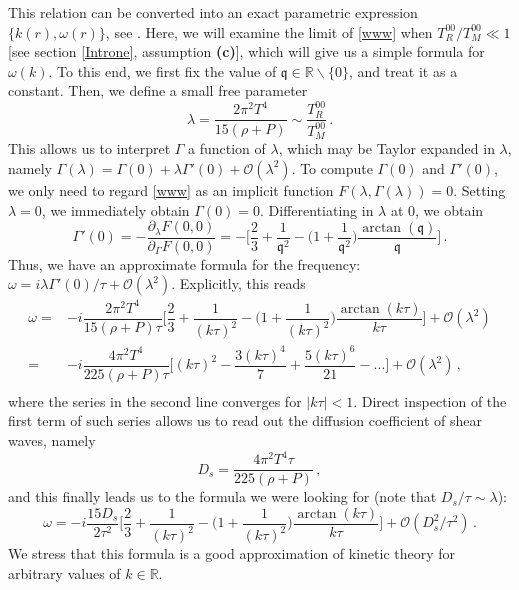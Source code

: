 \documentclass[a4paper, amsfonts, amssymb, amsmath, reprint, showkeys, nofootinbib, twoside,notitlepage,onecolumn]{revtex4-2}
\newcommand{\q}{{\mathfrak{q}}}
\theoremstyle{definition}
\theoremstyle{theorem}
\theoremstyle{corollary}
\begin{document}
This relation can be converted into an exact parametric expression $\{k(r),\omega(r)\}$, see \cite{GavassinoShearRadiation2024jej}. Here, we will examine the limit of \eqref{www} when $T_R^{00}/T_M^{00}\ll 1$ [see section \ref{Introne}, assumption \textbf{(c)}], which will give us a simple formula for $\omega(k)$. To this end, we first fix the value of $\q {\in} \mathbb{R}\backslash \{0\}$, and treat it as a constant. Then, we define a small free parameter
\begin{equation}\label{lambo}
    \lambda = \dfrac{2\pi^2 T^4}{15(\rho{+}P)} \sim \dfrac{T_R^{00}}{T_M^{00}} \, .
\end{equation}
This allows us to interpret $\Gamma$ a function of $\lambda$, which may be Taylor expanded in $\lambda$, namely $\Gamma(\lambda)=\Gamma(0)+\lambda  \Gamma'(0)+\mathcal{O}(\lambda^2)$. To compute $\Gamma(0)$ and $\Gamma'(0)$, we only need to regard \eqref{www} as an implicit function $F(\lambda,\Gamma(\lambda))=0$. Setting $\lambda=0$, we immediately obtain $\Gamma(0)=0$. Differentiating in $\lambda$ at $0$, we obtain 
\begin{equation}
\Gamma'(0)=-\dfrac{\partial_\lambda F(0,0)}{\partial_\Gamma F(0,0)}= -\bigg[ \dfrac{2}{3}+\dfrac{1}{\q^2}-\bigg( 1{+}\dfrac{1}{\q^2} \bigg) \dfrac{\arctan(\q)}{\q}  \bigg] \, . 
\end{equation}
Thus, we have an approximate formula for the frequency: $\omega=i\lambda \Gamma'(0)/\tau+\mathcal{O}(\lambda^2)$. Explicitly, this reads
\begin{equation}\label{seriaccio}
\begin{split}
\omega ={}& -i  \dfrac{2\pi^2 T^4}{15(\rho{+}P)\tau} \bigg[ \dfrac{2}{3}+\dfrac{1}{(k\tau)^2}-\bigg( 1{+}\dfrac{1}{(k\tau)^2} \bigg) \dfrac{\arctan(k\tau)}{k\tau}  \bigg] +\mathcal{O}(\lambda^2) \\
={}& -i  \dfrac{4\pi^2 T^4}{225(\rho{+}P)\tau} \bigg[(k\tau)^2 -\dfrac{3(k\tau)^4}{7} + \dfrac{5(k\tau)^6}{21} -...\bigg] +\mathcal{O}(\lambda^2) \, , \\
\end{split}
\end{equation}
where the series in the second line converges for $|k\tau|<1$. Direct inspection of the first term of such series allows us to read out the diffusion coefficient \cite{HellerBounds2023} of shear waves, namely
\begin{equation}\label{diffuzio}
D_s = \dfrac{4\pi^2 T^4 \tau}{225(\rho{+}P)} \, ,
\end{equation}
and this finally leads us to the formula we were looking for (note that $ D_s/\tau \sim \lambda$):
\begin{equation}
\omega =-i \dfrac{15D_s}{2\tau^2} \bigg[ \dfrac{2}{3}+\dfrac{1}{(k\tau)^2}-\bigg( 1{+}\dfrac{1}{(k\tau)^2} \bigg) \dfrac{\arctan(k\tau)}{k\tau}  \bigg] +\mathcal{O}(D_s^2/\tau^2) \, .
\end{equation}
We stress that this formula is a good approximation of kinetic theory for arbitrary values of $k \in \mathbb{R}$.
\end{document}
